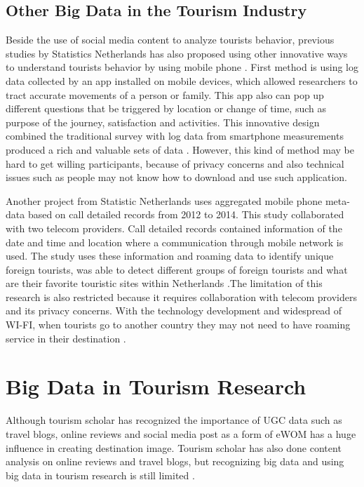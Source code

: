 \documentclass[sigconf]{acmart}
\begin{document}
\subsection{Other Big Data in the Tourism Industry}
Beside the use of social media content to analyze tourists behavior, previous studies
by Statistics Netherlands has also proposed using other innovative ways to understand
tourists behavior by using mobile phone \cite{heerschap2014innovation}. First method
is using log data collected by an app installed on mobile devices, which allowed
researchers to tract accurate movements of a person or family. This app also can pop
up different questions that be triggered by location or change of time, such as
purpose of the journey, satisfaction and activities. This innovative design combined
the traditional survey with log data from smartphone measurements produced a rich and
valuable sets of data \cite{heerschap2014innovation}. However, this kind of method may
be hard to get willing participants, because of privacy concerns and also technical
issues such as people may not know how to download and use such application.

Another project from Statistic Netherlands uses aggregated mobile phone meta-data
based on call detailed records from 2012 to 2014. This study collaborated with two
telecom providers. Call detailed records contained information of the date and time
and location where a communication through mobile network is used. The study uses
these information and roaming data to identify unique foreign tourists, was able to
detect different groups of foreign tourists and what are their favorite touristic
sites within Netherlands \cite{heerschap2014innovation}.The limitation of this
research is also restricted because it requires collaboration with telecom providers
and its privacy concerns. With the technology development and widespread of WI-FI,
when tourists go to another country they may not need to have roaming service in their
destination \cite{heerschap2014innovation}.   

\section{Big Data in Tourism Research}
Although tourism scholar has recognized the importance of UGC data such as travel
blogs, online reviews and social media post as a form of eWOM has a huge influence in
creating destination image. Tourism scholar has also done content analysis on online
reviews and travel blogs, but recognizing big data and using big data in tourism
research is still limited \cite{Williams201787,chung2009}. 
\end{document}

